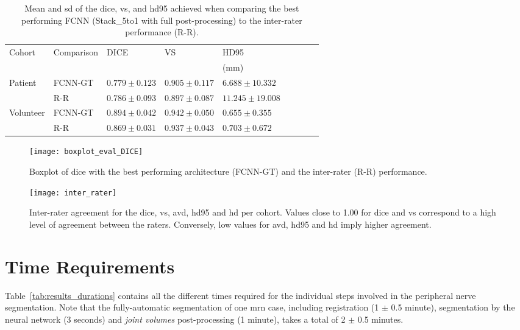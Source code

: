 \begin{table}[htbp]
   \centering
   \caption[Results for Comparison to Inter-Rater Performance]{Mean and \gls{sd} of the \acrlong{dice}, \acrlong{vs}, and \acrlong{hd95} achieved when comparing the best performing FCNN (Stack\_5to1 with full post-processing) to the inter-rater performance (R-R).}
   \begin{tabular}{l*{8}{l}}
      \toprule
      Cohort	& Comparison & DICE              & VS				& HD95\\
      			&			&					&					& (mm)\\
      \midrule
        Patient     & FCNN-GT & $0.779 \pm 0.123$ & $\mathbf{0.905 \pm 0.117}$ &                     $\mathbf{6.688  \pm 10.332}$ \\
                    & R-R     & $\mathbf{0.786 \pm 0.093}$ & $0.897 \pm 0.087$ &                     $11.245 \pm 19.008$ \\
        \midrule
        Volunteer   & FCNN-GT & $\mathbf{0.894 \pm 0.042}$ & $\mathbf{0.942 \pm 0.050}$ &                     $\mathbf{0.655  \pm 0.355} $ \\
                    & R-R     & $0.869 \pm 0.031$ & $0.937 \pm 0.043$ &                     $0.703  \pm 0.672 $ \\
      \bottomrule
   \end{tabular}
   \label{tab:res_fcnn_rater_small}
\end{table}

\begin{figure}[htbp]
	\centering
	\texttt{[image: boxplot\_eval\_DICE]}
    \caption[Boxplot of the \acrlong{dice} compared to the inter-rater performance]{Boxplot of \acrlong{dice} with the best performing architecture (FCNN-GT) and the inter-rater (R-R) performance.}
    \label{fig:results_eval_boxplot_dice}
\end{figure}

\begin{figure}[htbp]	
	\texttt{[image: inter\_rater]}
    \caption[Heatmap for Inter-Rater Agreement]{Inter-rater agreement for the \acrlong{dice}, \acrlong{vs}, \acrlong{avd}, \acrlong{hd95} and \acrlong{hd} per cohort. Values close to 1.00 for \gls{dice} and \gls{vs} correspond to a high level of agreement between the raters. Conversely, low values for \gls{avd}, \gls{hd95} and \gls{hd} imply higher agreement.}
    \label{fig:res_inter_rater}
\end{figure}

\section{Time Requirements} \label{sec:res_times}
Table~\ref{tab:results_durations} contains all the different times required for the individual steps involved in the peripheral nerve segmentation. Note that the fully-automatic segmentation of one \gls{mrn} case, including registration (1 $\pm$ 0.5 minute), segmentation by the neural network (3 seconds) and \textit{joint volumes} post-processing (1 minute), takes a total of 2 $\pm$ 0.5 minutes.

